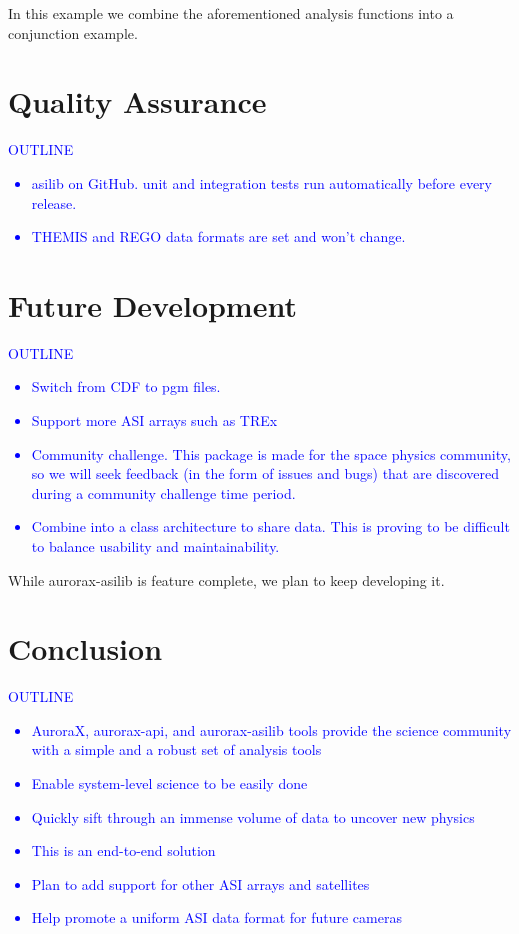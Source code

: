 \documentclass[draft]{agujournal2019}
\begin{document}
In this example we combine the aforementioned analysis functions into a conjunction example. 

\section{Quality Assurance}
\textcolor{blue}{
      OUTLINE
      \begin{itemize}
            \item asilib on GitHub. unit and integration tests run automatically before every release.
            \item THEMIS and REGO data formats are set and won't change.
      \end{itemize}
}

\section{Future Development}
\textcolor{blue}{
      OUTLINE
      \begin{itemize}
            \item Switch from CDF to pgm files.
            \item Support more ASI arrays such as TREx
            \item Community challenge. This package is made for the space physics community, so we will seek feedback (in the form of issues and bugs) that are discovered during a community challenge time period. 
            \item Combine into a class architecture to share data. This is proving to be difficult to balance usability and maintainability.
      \end{itemize}
}
While aurorax-asilib is feature complete, we plan to keep developing it.

\section{Conclusion}

\textcolor{blue}{
      OUTLINE
      \begin{itemize}
            \item AuroraX, aurorax-api, and aurorax-asilib tools provide the science community with a simple and a robust set of analysis tools
            \item Enable system-level science to be easily done
            \item Quickly sift through an immense volume of data to uncover new physics
            \item This is an end-to-end solution
            \item Plan to add support for other ASI arrays and satellites
            \item Help promote a uniform ASI data format for future cameras
      \end{itemize}
}
\end{document}
